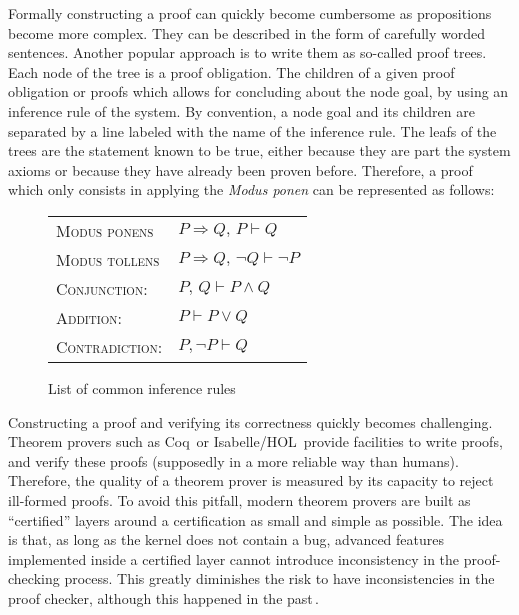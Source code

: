 Formally constructing a proof can quickly become cumbersome as propositions
become more complex.
%
They can be described in the form of carefully worded sentences.
%
Another popular approach is to write them as so-called proof trees.
%
Each node of the tree is a proof obligation.
%
The children of a given proof obligation or proofs which allows for concluding
about the node goal, by using an inference rule of the system.
%
By convention, a node goal and its children are separated by a line labeled with
the name of the inference rule.
%
The leafs of the trees are the statement known to be true, either because they
are part the system axioms or because they have already been proven before.
%
Therefore, a proof which only consists in applying the \emph{Modus ponen} can be
represented as follows:
%
\begin{prooftree}
     
\end{prooftree}

\begin{figure}
  \begin{center}
    \begin{tabular}{ll}
      {\scshape Modus ponens} & \( P \Rightarrow Q\text{, }P \vdash Q \) \\
      {\scshape Modus tollens} &
                                 \( P \Rightarrow Q\text{, }\neg Q \vdash \neg P \) \\
      {\scshape Conjunction:} & \( P\text{, }Q \vdash P \wedge Q \) \\
      {\scshape Addition:} & \( P \vdash P \vee Q \) \\
      {\scshape Contradiction:} & \( P, \neg P \vdash Q \)
    \end{tabular}
  \end{center}

  \caption{List of common inference rules}
  \label{fig:sota:inference}
\end{figure}

Constructing a proof and verifying its correctness quickly becomes challenging.
%
Theorem provers such as Coq\,\cite{coq} or
Isabelle/HOL\,\cite{nipkow2002isabelle} provide facilities to write proofs, and
verify these proofs (supposedly in a more reliable way than humans).
%
Therefore, the quality of a theorem prover is measured by its capacity to reject
ill-formed proofs.
%
To avoid this pitfall, modern theorem provers are built as ``certified'' layers
around a certification as small and simple as possible.
%
The idea is that, as long as the kernel does not contain a bug, advanced
features implemented inside a certified layer cannot introduce inconsistency in
the proof-checking process.
%
This greatly diminishes the risk to have inconsistencies in the proof checker,
although this happened in the
past\,\cite{claret2015falso,griffioen1998comparison}.

